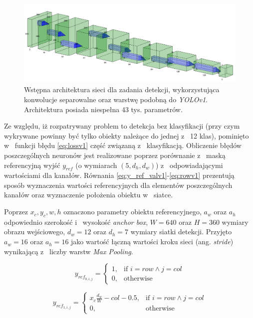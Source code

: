 \begin{figure}
    \centering
    \includegraphics[width=\linewidth]{images/arch_v1.png}
    \caption{Wstępna architektura sieci dla zadania detekcji, wykorzystująca konwolucje separowalne oraz warstwę podobną do \emph{YOLOv1}. Architektura posiada niespełna 43 tys. parametrów.}
    \label{fig:arch_v1}
\end{figure}

Ze względu, iż rozpatrywany problem to detekcja bez klasyfikacji (przy czym wykrywane powinny być tylko obiekty należące do jednej z~ 12 klas), pominięto w~ funkcji błędu \eqref{eq:lossv1} część związaną z~ klasyfikacją. 
Obliczenie błędów poszczególnych neuronów jest realizowane poprzez porównanie z~ maską referencyjną wyjść $y_{ref}$ (o wymiarach $(5,d_h,d_w)$) z~ odpowiadającymi wartościami dla kanałów. 
Równania \eqref{eq:y_ref_valv1}-\eqref{eq:rowv1} prezentują sposób wyznaczenia wartości referencyjnych dla elementów poszczególnych kanałów oraz wyznaczenie położenia obiektu w~ siatce.

Poprzez $x_c, y_c, w, h$ oznaczono parametry obiektu referencyjnego, $a_w$ oraz $a_h$  odpowiednio szerokość i~ wysokość \emph{anchor box}, $W = 640$ oraz $H = 360$ wymiary obrazu wejściowego, $d_w = 12$ oraz $d_h = 7$ wymiary siatki detekcji. 
Przyjęto  $a_w = 16$ oraz $a_h = 16$ jako wartość łączną wartości kroku sieci (ang. \emph{stride}) wynikającą z~ liczby warstw \emph{Max Pooling}.

\begin{equation}
y_{ref}_{0,i,j} = 
\begin{cases}
    1, & \text{if }  i = row \land j = col \\
    0,              & \text{otherwise}
\end{cases}
\label{eq:y_ref_valv1}
\end{equation}

\begin{equation}
y_{ref}_{1,i,j} = 
\begin{cases}
    x_c \frac{d_w}{W} - col - 0.5, & \text{if }  i = row \land j = col \\
    0,              & \text{otherwise}
\end{cases}
\label{eq:y_ref_xv1}
\end{equation}

